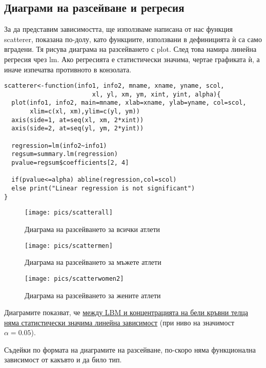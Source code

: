 \documentclass[12pt]{article}
\begin{document}
\begin{large}
\subsection{Диаграми на разсейване и регресия}
За да представим зависимостта, ще използваме написана от нас функция scatterer, показана по-долу, като функциите, използвани в дефиницията ѝ са само вградени. Тя рисува диаграма на разсейването с plot. След това намира линейна регресия чрез lm. Ако регресията е статистически значима, чертае графиката ѝ, а иначе изпечатва противното в конзолата.

\begin{verbatim}
scatterer<-function(info1, info2, mname, xname, yname, scol,
                    	xl, yl, xm, ym, xint, yint, alpha){
  plot(info1, info2, main=mname, xlab=xname, ylab=yname, col=scol,
       xlim=c(xl, xm),ylim=c(yl, ym))
  axis(side=1, at=seq(xl, xm, 2*xint))
  axis(side=2, at=seq(yl, ym, 2*yint))
  
  regression=lm(info2~info1)
  regsum=summary.lm(regression)
  pvalue=regsum$coefficients[2, 4]
  
  if(pvalue<=alpha) abline(regression,col=scol)
  else print("Linear regression is not significant")
}
\end{verbatim}

\begin{figure}[!h!]
\texttt{[image: pics/scatterall]}
\caption{Диаграма на разсейването за всички атлети}
\end{figure}

\begin{figure}[!h!]
\texttt{[image: pics/scattermen]}
\caption{Диаграма на разсейването за мъжете атлети}
\end{figure}

\clearpage
\begin{figure}[!h!]
\texttt{[image: pics/scatterwomen2]}
\caption{Диаграма на разсейването за жените атлети}
\end{figure}

Диаграмите показват, че \uline{между LBM и концентрацията на бели кръвни телца няма статистически значима линейна зависимост} (при ниво на значимост $\alpha=0.05$). \par
Съдейки по формата на диаграмите на разсейване, по-скоро няма функционална зависимост от какъвто и да било тип.


\end{large}
\end{document}
